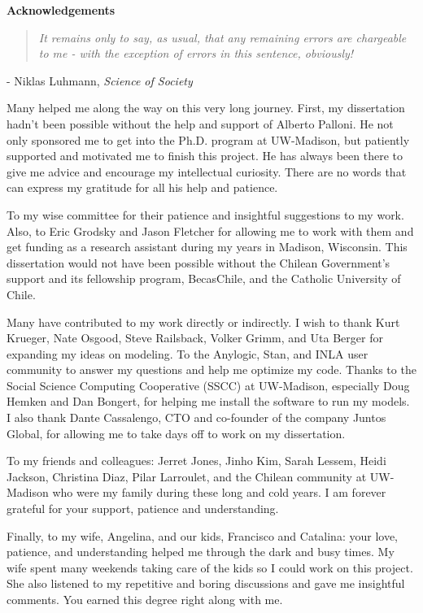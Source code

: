 \documentclass[12pt]{report}
\newcommand{\chapquote}[3]{\begin{quotation} \textit{#1} \end{quotation} \begin{flushright} - #2, \textit{#3}\end{flushright}\vspace{2cm}}
\begin{document}
\setcounter{page}{1}

\newpage
\begin{center}
\textbf{\large{Acknowledgements}}
\end{center}





\vspace{1cm}
\chapquote{It remains only to say, as usual, that any remaining errors are chargeable to me - with the exception of errors in this sentence, obviously!}{Niklas Luhmann}{Science of Society}

\begin{doublespace}

\noindent Many helped me along the way on this very long journey. First, my dissertation hadn't been possible without the help and support of Alberto Palloni. He not only sponsored me to get into the Ph.D. program at UW-Madison, but patiently supported and motivated me to finish this project. He has always been there to give me advice and encourage my intellectual curiosity. There are no words that can express my gratitude for all his help and patience.

To my wise committee for their patience and insightful suggestions to my work. Also, to Eric Grodsky and Jason Fletcher for allowing me to work with them and get funding as a research assistant during my years in Madison, Wisconsin. This dissertation would not have been possible without the Chilean Government's support and its fellowship program, BecasChile, and the Catholic University of Chile.

Many have contributed to my work directly or indirectly. I wish to thank Kurt Krueger, Nate Osgood,  Steve Railsback, Volker Grimm, and Uta Berger for expanding my ideas on modeling. To the Anylogic, Stan, and INLA user community to answer my questions and help me optimize my code. Thanks to the Social Science Computing Cooperative (SSCC) at UW-Madison, especially Doug Hemken and Dan Bongert, for helping me install the software to run my models. I also thank Dante Cassalengo, CTO and co-founder of the company Juntos Global, for allowing me to take days off to work on my dissertation.

To my friends and colleagues: Jerret Jones, Jinho Kim, Sarah Lessem, Heidi Jackson, Christina Diaz, Pilar Larroulet, and the Chilean community at UW-Madison who were my family during these long and cold years. I am forever grateful for your support, patience and understanding.

Finally, to my wife, Angelina, and our kids, Francisco and Catalina: your love, patience, and understanding helped me through the dark and busy times. My wife spent many weekends taking care of the kids so I could work on this project. She also listened to my repetitive and boring discussions and gave me insightful comments. You earned this degree right along with me.
\end{doublespace}
\end{document}
